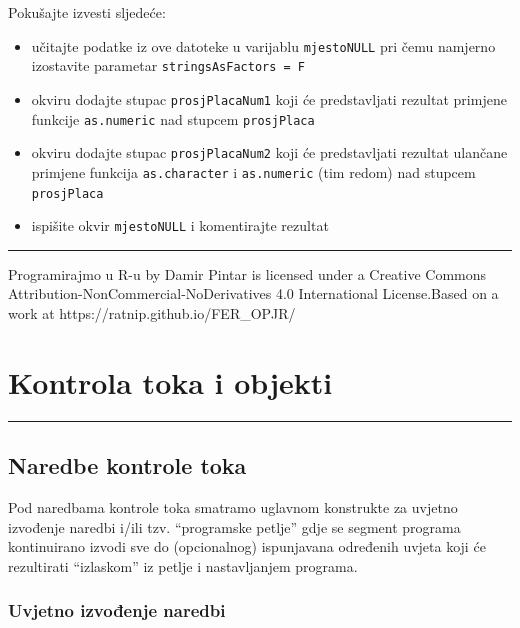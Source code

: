 \documentclass[]{book}
\providecommand{\tightlist}{%
  \setlength{\itemsep}{0pt}\setlength{\parskip}{0pt}}
\theoremstyle{definition}
\theoremstyle{definition}
\theoremstyle{definition}
\theoremstyle{remark}
\begin{document}
Pokušajte izvesti sljedeće:

\begin{itemize}
\tightlist
\item
  učitajte podatke iz ove datoteke u varijablu \texttt{mjestoNULL} pri
  čemu namjerno izostavite parametar \texttt{stringsAsFactors\ =\ F}
\item
  okviru dodajte stupac \texttt{prosjPlacaNum1} koji će predstavljati
  rezultat primjene funkcije \texttt{as.numeric} nad stupcem
  \texttt{prosjPlaca}
\item
  okviru dodajte stupac \texttt{prosjPlacaNum2} koji će predstavljati
  rezultat ulančane primjene funkcija \texttt{as.character} i
  \texttt{as.numeric} (tim redom) nad stupcem \texttt{prosjPlaca}
\item
  ispišite okvir \texttt{mjestoNULL} i komentirajte rezultat
\end{itemize}

\begin{center}\rule{0.5\linewidth}{\linethickness}\end{center}

{Programirajmo u R-u} by Damir Pintar is licensed under a Creative
Commons Attribution-NonCommercial-NoDerivatives 4.0 International
License.Based on a work at https://ratnip.github.io/FER\_OPJR/

\chapter{Kontrola toka i objekti}\label{kontrola}

\begin{center}\rule{0.5\linewidth}{\linethickness}\end{center}

\section{Naredbe kontrole toka}\label{naredbe-kontrole-toka}

Pod naredbama kontrole toka smatramo uglavnom konstrukte za uvjetno
izvođenje naredbi i/ili tzv. ``programske petlje'' gdje se segment
programa kontinuirano izvodi sve do (opcionalnog) ispunjavana određenih
uvjeta koji će rezultirati ``izlaskom'' iz petlje i nastavljanjem
programa.

\subsection{Uvjetno izvođenje naredbi}\label{uvjetno-izvoenje-naredbi}
\end{document}
